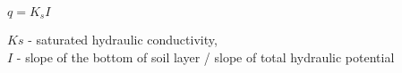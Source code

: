 \documentclass{article}
\begin{document}
  
  $
    q = K_s I
  $
  
  $Ks$ - saturated hydraulic conductivity, \\
  $I$  - slope of the bottom of soil layer / slope of  total hydraulic potential
\end{document}
